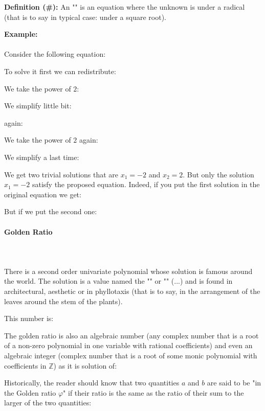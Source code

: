 	\textbf{Definition  (\#\mydef):} An "" is an equation where the unknown is under a radical (that is to say in typical case: under a square root).
	
	\begin{tcolorbox}[colframe=black,colback=white,sharp corners]
	\textbf{{\Large {}}Example:}\\\\
	Consider the following equation:
	
	To solve it first we can redistribute:
	
	We take the power of $2$:
	
	We simplify little bit:
	
	again:
	
	We take the power of $2$ again:
	
	We simplify a last time:
	
	We get two trivial solutions that are $x_1=-2$ and $x_2=2$. But only the solution $x_1=-2$ satisfy the proposed equation. Indeed, if you put the first solution in the original equation we get:
	
	But if we put the second one:
		
	\end{tcolorbox}
	
	\pagebreak
	\paragraph{Golden Ratio}\mbox{}\\\\
	There is a second order univariate polynomial whose solution is famous around the world. The solution is a value named the "\label{golden ratio}" or "" (...) and is found in architectural, aesthetic or in phyllotaxis (that is to say, in the arrangement of the leaves around the stem of the plants).
	
	This number is:
	
	The golden ratio is also an algebraic number (any complex number that is a root of a non-zero polynomial in one variable with rational coefficients) and even an algebraic integer (complex number that is a root of some monic polynomial with coefficients in $\mathbb{Z}$) as it is solution of:
	
	Historically, the reader should know that two quantities $a$ and $b$ are said to be "in the Golden ratio $\varphi$" if their ratio is the same as the ratio of their sum to the larger of the two quantities:
	
